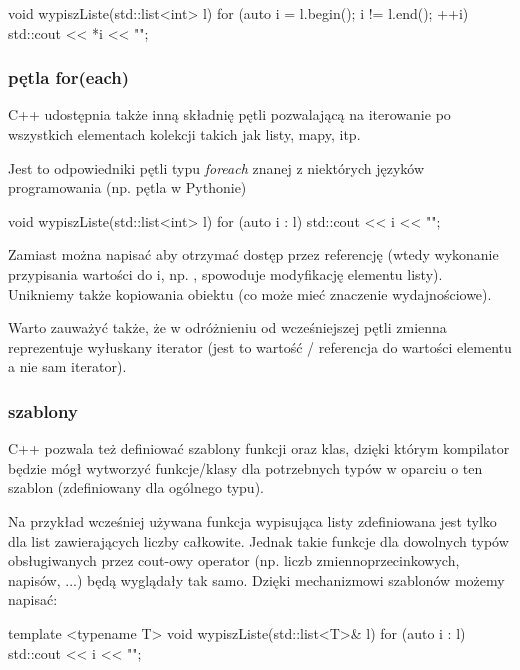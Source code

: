 \begin{CodeFrame*}[cpp]{}
void wypiszListe(std::list<int> l) {
    for (auto i = l.begin(); i != l.end(); ++i) {
        std::cout << *i << "\n";
    }
}
\end{CodeFrame*}

\subsubsection{pętla for(each)}

C++ udostępnia także inną składnię pętli  pozwalającą
na iterowanie po wszystkich elementach kolekcji takich jak
listy, mapy, itp.

Jest to odpowiedniki pętli typu \textit{foreach} znanej z niektórych
języków programowania (np. pętla  w Pythonie)

\begin{CodeFrame*}[cpp]{}
void wypiszListe(std::list<int> l) {
    for (auto i : l) {
        std::cout << i << "\n";
    }
}
\end{CodeFrame*}

Zamiast  można napisać  aby otrzymać dostęp
przez referencję (wtedy wykonanie przypisania wartości do i,
np. , spowoduje modyfikację elementu listy).
Unikniemy także kopiowania obiektu (co może mieć znaczenie wydajnościowe).

Warto zauważyć także, że w odróżnieniu od wcześniejszej pętli
zmienna reprezentuje wyłuskany iterator (jest to wartość /
referencja do wartości elementu a nie sam iterator).

\subsubsection{szablony}

C++ pozwala też definiować szablony funkcji oraz klas,
dzięki którym kompilator będzie mógł wytworzyć funkcje/klasy dla potrzebnych typów
w oparciu o ten szablon (zdefiniowany dla ogólnego typu).

Na przykład wcześniej używana funkcja wypisująca listy
zdefiniowana jest tylko dla list zawierających liczby całkowite.
Jednak takie funkcje dla dowolnych typów obsługiwanych przez cout-owy operator \cpp{<<}
(np. liczb zmiennoprzecinkowych, napisów, ...) będą wyglądały tak samo.
Dzięki mechanizmowi szablonów możemy napisać:

\begin{CodeFrame*}[cpp]{}
template <typename T> void wypiszListe(std::list<T>& l) {
    for (auto i : l) {
        std::cout << i << "\n";
    }
}
\end{CodeFrame*}

